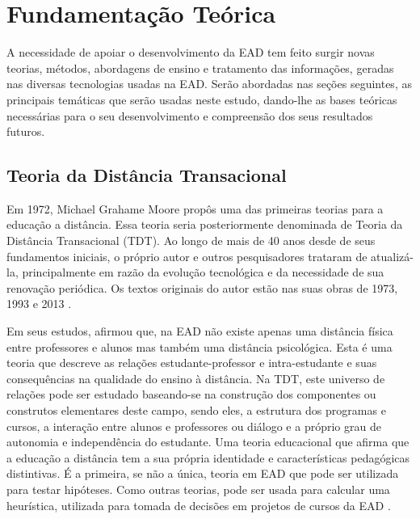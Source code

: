 \chapter{Fundamentação Teórica}

A necessidade de apoiar o desenvolvimento da EAD tem feito surgir novas teorias,
métodos, abordagens de ensino e tratamento das informações, geradas nas diversas
tecnologias usadas na EAD. Serão abordadas nas seções seguintes, as principais
temáticas que serão usadas neste estudo, dando-lhe as bases teóricas necessárias
para o seu desenvolvimento e compreensão dos seus resultados futuros.

\section{Teoria da Distância Transacional}

Em 1972, Michael Grahame Moore propôs uma das primeiras teorias para a educação
a distância. Essa teoria seria posteriormente denominada de Teoria da Distância
Transacional (TDT). Ao longo de mais de 40 anos desde de seus fundamentos
iniciais, o próprio autor e outros pesquisadores trataram de atualizá-la,
principalmente em razão da evolução tecnológica e da necessidade de sua
renovação periódica. Os textos originais do autor estão nas suas obras de 1973,
1993 e 2013 \cite{moore1973transational}.

Em seus estudos,  afirmou que, na EAD
não existe apenas uma distância física entre professores e alunos mas também uma
distância psicológica. Esta é uma teoria que descreve as relações
estudante-professor e intra-estudante e suas consequências na qualidade do
ensino à distância. Na TDT, este universo de relações pode ser estudado
baseando-se na construção dos componentes ou construtos elementares deste campo,
sendo eles, a estrutura dos programas e cursos, a interação entre alunos e
professores ou diálogo e a próprio grau de autonomia e independência do
estudante. Uma teoria educacional que afirma que a educação a distância tem a
sua própria identidade e características pedagógicas distintivas. É a primeira,
se não a única, teoria em EAD que pode ser utilizada para testar hipóteses. Como
outras teorias, pode ser usada para calcular uma heurística, utilizada para
tomada de decisões em projetos de cursos da EAD \cite{moore2008teoria}.

